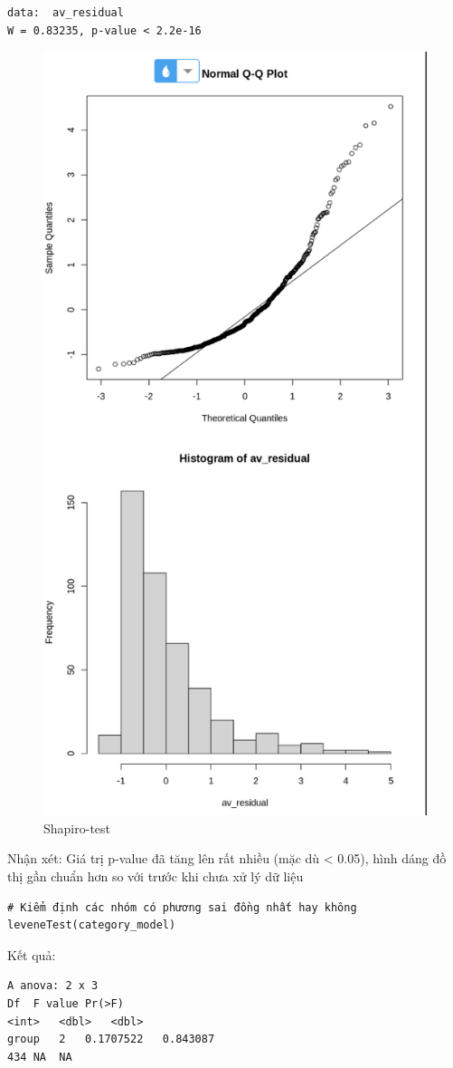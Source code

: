 \begin{itemize}
\begin{itemize}
\begin{lstlisting}
data:  av_residual
W = 0.83235, p-value < 2.2e-16
    \end{lstlisting}
    \begin{figure}[H]
        \centering
        \includegraphics[width=0.8\linewidth]{part23_figures/27.png}
        \caption{Shapiro-test}
        \label{fig:Shapiro-test và đồ thị phân phối}
    \end{figure}

    Nhận xét: Giá trị p-value đã tăng lên rất nhiều (mặc dù < 0.05), hình dáng đồ thị gần chuẩn hơn so với trước khi chưa xử lý dữ liệu
   \end{itemize}
    \begin{lstlisting}
# Kiểm định các nhóm có phương sai đồng nhất hay không
leveneTest(category_model)
    \end{lstlisting}
    Kết quả:
    \begin{lstlisting}
A anova: 2 x 3
Df	F value	Pr(>F)
<int>	<dbl>	<dbl>
group	2	0.1707522	0.843087
434	NA	NA


\end{lstlisting}
\end{itemize}
